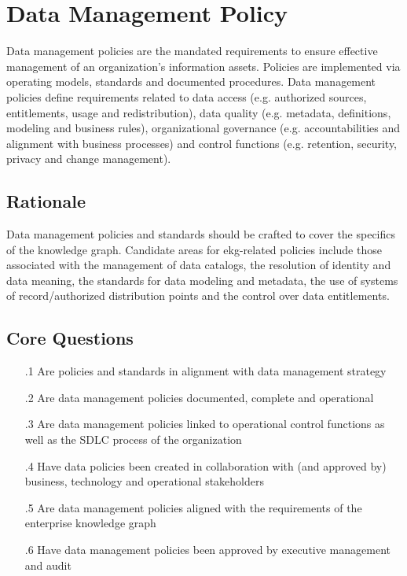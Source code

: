 \section{Data Management Policy}\label{sec:ekgmm-b-4-2} %

Data management policies are the mandated requirements to ensure effective management of an organization’s information assets.
Policies are implemented via operating models, standards and documented procedures.
Data management policies define requirements related to data access (e.g. authorized sources, entitlements, usage and redistribution),
data quality (e.g. metadata, definitions, modeling and business rules), organizational governance (e.g. accountabilities and alignment with business processes) and control functions (e.g. retention, security, privacy and change management).

\subsection*{ Rationale}

Data management policies and standards should be crafted to cover the specifics of the knowledge graph.
Candidate areas for \acrshort{ekg}-related policies include those associated with the management of data catalogs, the resolution of identity and data meaning, the standards for data modeling and metadata, the use of systems of record/authorized distribution points and the control over data entitlements.

\subsection*{Core Questions}

\begin{itemize}[leftmargin=.5in]

  \item [\thesection.1] Are policies and standards in alignment with data management strategy
  \item [\thesection.2] Are data management policies documented, complete and operational
  \item [\thesection.3] Are data management policies linked to operational control functions as well as the SDLC process of the organization
  \item [\thesection.4] Have data policies been created in collaboration with (and approved by) business, technology and operational stakeholders
  \item [\thesection.5] Are data management policies aligned with the requirements of the enterprise knowledge graph
  \item [\thesection.6] Have data management policies been approved by executive management and audit

\end{itemize}
